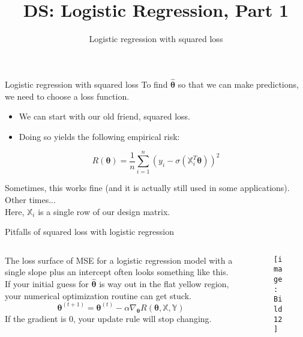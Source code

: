 \documentclass[aspectratio=169]{../latex_main/tntbeamer}  %
\title[Introduction]{DS: Logistic Regression, Part 1}
\subtitle{Logistic regression with squared loss}
\begin{document}
	
	\maketitle
	\begin{frame}{Logistic regression with squared loss}
	    To find   $\hat{\bm{\theta}}$   so that we can make predictions, we need to choose a loss function. 
        \begin{itemize}
            \item We can start with our old friend, squared loss.
            \item Doing so yields the following empirical risk:
        \end{itemize}
        \begin{equation*}
            R(\bm{\theta}) = \frac{1}{n}\sum\limits_{i=1}^n(y_i-\sigma (\mathbb{X}_i^T\bm{\bm{\theta}}))^2
        \end{equation*}
        
        Sometimes, this works fine (and it is actually still used in some applications). Other times...\\
        \bigskip
        Here,    $\mathbb{X}_i$    is a single row of our design matrix.


	\end{frame}
	
	\begin{frame}{Pitfalls of squared loss with logistic regression}
	    \begin{columns}
	        \begin{column}{.4\textwidth}
	                The loss surface of MSE for a logistic regression model with a single slope plus an intercept often looks something like this.\\
	                \bigskip
	                If your initial guess for   $\hat{\bm{\theta}}$  is way out in the flat yellow region, your numerical optimization routine can get stuck.
	                \begin{equation*}
	                    \bm{\theta}^{(t+1)} = \bm{\theta}^{(t)} - \alpha\nabla_{\bm{\theta}} R(\bm{\theta},\mathbb{X},\mathbb{Y})
	                \end{equation*}
	                If the gradient is 0, your update rule will stop changing.
	        \end{column}
	        
	        
	        \begin{column}{.4\textwidth}
	                \begin{figure}
	                    \centering
	                    \texttt{[image: Bild12]}
	                \end{figure}
	       \end{column}
	    \end{columns}
	\end{frame}
	
\end{document}
